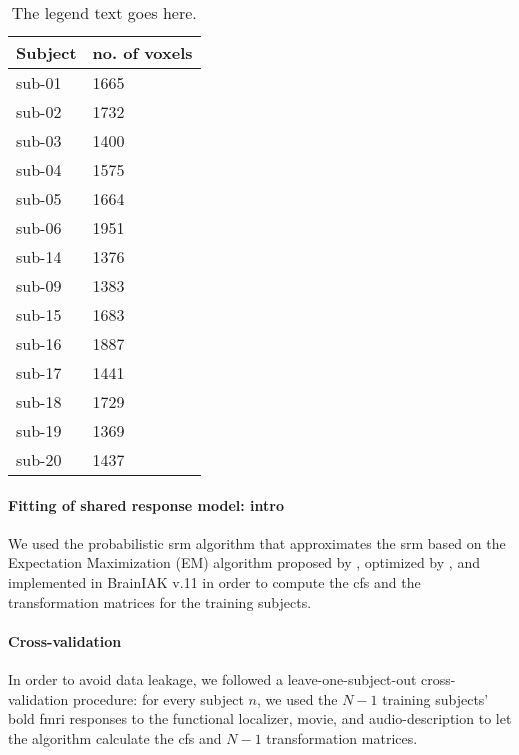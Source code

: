 

\begin{table*}[btp]
    \caption{
    \textbf{Table heading.}
    Number of remaining voxels after time series data of each paradigm
    and subject were masked with the union of individual \acp{ppa} that was
    warped from MNI space into each individual's subjects-space and the
    subject-specific field of view of audio-description.}

\label{tab:ppamaskvoxels}
\begin{tabular}{ll}
    \toprule
    \textbf{Subject} & \textbf{no. of voxels} \\
    \midrule
    sub-01 & 1665 \tabularnewline
    sub-02 & 1732 \tabularnewline
    sub-03 & 1400 \tabularnewline
    sub-04 & 1575 \tabularnewline
    sub-05 & 1664 \tabularnewline
    sub-06 & 1951 \tabularnewline
    sub-14 & 1376 \tabularnewline
    sub-09 & 1383 \tabularnewline
    sub-15 & 1683 \tabularnewline
    sub-16 & 1887 \tabularnewline
    sub-17 & 1441 \tabularnewline
    sub-18 & 1729 \tabularnewline
    sub-19 & 1369 \tabularnewline
    sub-20 & 1437 \tabularnewline
    \bottomrule
\end{tabular}
\caption*{The legend text goes here.}
\end{table*}


\paragraph{Fitting of shared response model: intro}


We used the probabilistic \ac{srm} algorithm that approximates the \ac{srm}
based on the Expectation Maximization (EM) algorithm proposed by
\citep{chen2015reduced}, optimized by \citet{anderson2016enabling}, and
implemented in BrainIAK v.11 \citep[Brain Imaging Analysis
Kit;][]{kumar2020brainiak, kumar2020brainiaktutorial} in order to compute the
\ac{cfs} and the transformation matrices for the training subjects.


\paragraph{Cross-validation}
%
In order to avoid data leakage, we followed a leave-one-subject-out
cross-validation procedure:
%
for every subject $n$, we used the $N-1$ training subjects' \ac{bold} \ac{fmri}
responses to the functional localizer, movie, and audio-description to let the
algorithm calculate the \ac{cfs} and $N-1$ transformation matrices.


